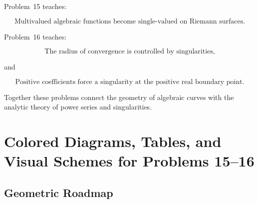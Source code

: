 \documentclass[12pt,a4paper]{article}
\theoremstyle{notespace}
\begin{document}
Problem~15 teaches:

\[
\boxed{
	\text{Multivalued algebraic functions become single-valued on Riemann surfaces.}
}
\]

Problem~16 teaches:

\[
\boxed{
	\text{The radius of convergence is controlled by singularities,}
}
\]

and

\[
\boxed{
	\text{Positive coefficients force a singularity at the positive real boundary point.}
}
\]

Together these problems connect the geometry of algebraic curves with the analytic theory of power series and singularities.

\section{Colored Diagrams, Tables, and Visual Schemes for Problems 15--16}

\subsection{Geometric Roadmap}
\end{document}
